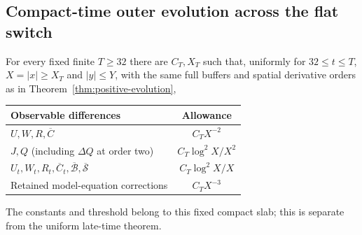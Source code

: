 \subsection{Compact-time outer evolution across the flat switch}
\begin{theorem}
\label{thm:compact-positive-evolution}
For every fixed finite $T\ge32$ there are $C_T,X_T$ such that,
uniformly for $32\le t\le T$, $X=|x|\ge X_T$ and $|y|\le Y$,
with the same full buffers and spatial derivative orders as in
Theorem~\ref{thm:positive-evolution},
\begin{center}
\begin{tabular}{@{}p{}c@{}}
\toprule
Observable differences & Allowance\\
\midrule
$U,W,R,\overline C$ & $C_TX^{-2}$\\
$J,Q$ (including $\Delta Q$ at order two) & $C_T\log^2X/X^2$\\
$U_t,W_t,R_t,\overline C_t,\overline{\mathcal B},
 \overline{\mathcal S}$ & $C_T\log^2X/X$\\
Retained model-equation corrections & $C_TX^{-3}$\\
\bottomrule
\end{tabular}
\end{center}
The constants and threshold belong to this fixed compact slab; this
is separate from the uniform late-time theorem.
\end{theorem}
